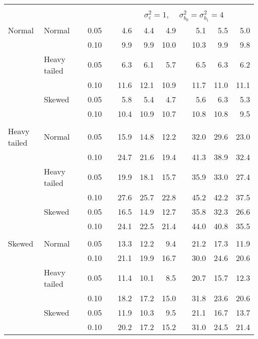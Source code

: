 \begin{table}[ht]
\begin{scriptsize}
\begin{tabular}{ll p{.1cm} c p{.1cm} rrr p{.1cm} rrr}
&&&&&&&&&&&\\
& && && \multicolumn{7}{c}{$\sigma_{\varepsilon}^2 = 1$, \ \ $\sigma_{b_0}^2 = \sigma_{b_1}^2 = 4$} \\ \cline{6-12}
\rowcolor{gray!20} Normal & Normal &  & 0.05 &  & 4.6 & 4.4 & 4.9 &  & 5.1 & 5.5 & 5.0 \\ 
\rowcolor{gray!20}    &  &  & 0.10 &  & 9.9 & 9.9 & 10.0 &  & 10.3 & 9.9 & 9.8 \\ 
\rowcolor{gray!20}    & Heavy tailed &  & 0.05 &  & 6.3 & 6.1 & 5.7 &  & 6.5 & 6.3 & 6.2 \\ 
\rowcolor{gray!20}    &  &  & 0.10 &  & 11.6 & 12.1 & 10.9 &  & 11.7 & 11.0 & 11.1 \\ 
\rowcolor{gray!20}    & Skewed &  & 0.05 &  & 5.8 & 5.4 & 4.7 &  & 5.6 & 6.3 & 5.3 \\ 
\rowcolor{gray!20}    &  &  & 0.10 &  & 10.4 & 10.9 & 10.7 &  & 10.8 & 10.8 & 9.5 \\ 
&&&&&&&&&&&\\
  Heavy tailed & Normal &  & 0.05 &  & 15.9 & 14.8 & 12.2 &  & 32.0 & 29.6 & 23.0 \\ 
   &  &  & 0.10 &  & 24.7 & 21.6 & 19.4 &  & 41.3 & 38.9 & 32.4 \\ 
   & Heavy tailed &  & 0.05 &  & 19.9 & 18.1 & 15.7 &  & 35.9 & 33.0 & 27.4 \\ 
   &  &  & 0.10 &  & 27.6 & 25.7 & 22.8 &  & 45.2 & 42.2 & 37.5 \\ 
   & Skewed &  & 0.05 &  & 16.5 & 14.9 & 12.7 &  & 35.8 & 32.3 & 26.6 \\ 
   &  &  & 0.10 &  & 24.1 & 22.5 & 21.4 &  & 44.0 & 40.8 & 35.5 \\ 
&&&&&&&&&&&\\ 
  Skewed & Normal &  & 0.05 &  & 13.3 & 12.2 & 9.4 &  & 21.2 & 17.3 & 11.9 \\ 
   &  &  & 0.10 &  & 21.1 & 19.9 & 16.7 &  & 30.0 & 24.6 & 20.6 \\ 
   & Heavy tailed &  & 0.05 &  & 11.4 & 10.1 & 8.5 &  & 20.7 & 15.7 & 12.3 \\ 
   &  &  & 0.10 &  & 18.2 & 17.2 & 15.0 &  & 31.8 & 23.6 & 20.6 \\ 
   & Skewed &  & 0.05 &  & 11.9 & 10.3 & 9.5 &  & 21.1 & 16.7 & 13.7 \\ 
   &  &  & 0.10 &  & 20.2 & 17.2 & 15.2 &  & 31.0 & 24.5 & 21.4 \\ 

\hline
\end{tabular}
\end{scriptsize}
\end{table}



